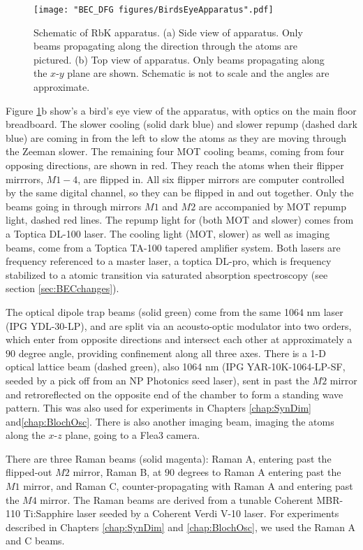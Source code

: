 \begin{figure}
	\texttt{[image: "BEC\_DFG figures/BirdsEyeApparatus".pdf]}
\caption[Schematic of RbK apparatus]{Schematic of RbK apparatus. (a) Side view of apparatus. Only beams propagating along the \ez{} direction through the atoms are pictured. (b) Top view of apparatus. Only beams propagating along the $x$-$y$ plane are shown. Schematic is not to scale and the angles are approximate.}
\label{fig:BirdsEyeApparatus}
\end{figure}

Figure \ref{fig:BirdsEyeApparatus}b show's a bird's eye view of the apparatus, with optics on the main floor breadboard. The slower cooling (solid dark blue) and slower repump (dashed dark blue) are coming in from the left to slow the atoms as they are moving through the Zeeman slower. The remaining four MOT cooling beams, coming from four opposing directions, are shown in red.  They reach the atoms when their flipper mirrrors, $M1-4$, are flipped in. All six flipper mirrors are computer controlled by the same digital channel, so they can be flipped in and out together. Only the beams going in through mirrors $M1$ and $M2$ are accompanied by MOT repump light, dashed red lines. The repump light for \Rb{} (both MOT and slower) comes from a Toptica DL-100 laser. The cooling light (MOT, slower) as well as imaging beams, come from a Toptica TA-100 tapered amplifier system. Both lasers are frequency referenced to a master laser, a toptica DL-pro, which is frequency stabilized to a \Rb{} atomic transition via saturated absorption spectroscopy (see section \ref{sec:BECchanges}).

The optical dipole trap beams (solid green) come from the same 1064 nm laser (IPG YDL-30-LP), and are split via an acousto-optic modulator into two orders, which enter from opposite directions and intersect each other at approximately a $90$ degree angle, providing confinement along all three axes.  There is a 1-D optical lattice beam (dashed green), also 1064 nm (IPG YAR-10K-1064-LP-SF, seeded by a pick off from an NP Photonics seed laser), sent in past the $M2$ mirror and retroreflected on the opposite end of the chamber to form a standing wave pattern. This was also used for experiments in Chapters \ref{chap:SynDim} and\ref{chap:BlochOsc}. There is also another imaging beam, imaging the atoms along the $x$-$z$ plane, going to a Flea3 camera. 

There are three Raman beams (solid magenta): Raman A, entering past the flipped-out $M2$ mirror, Raman B, at $90$ degrees to Raman A entering past the $M1$ mirror, and Raman C, counter-propagating with Raman A and entering past the $M4$ mirror. The Raman beams are derived from a tunable Coherent MBR-110 Ti:Sapphire laser seeded by a Coherent Verdi V-10 laser. For experiments described in Chapters \ref{chap:SynDim} and \ref{chap:BlochOsc}, we used the Raman A and C beams.

